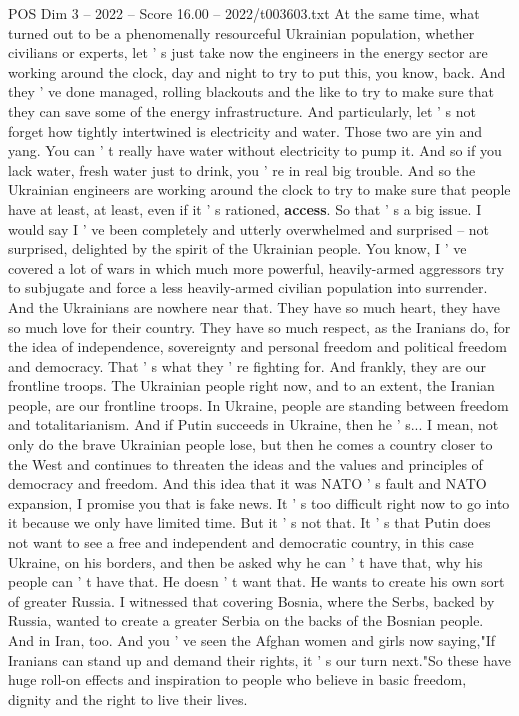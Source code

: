 \begin{textsample}{POS Dim 3 – 2022 – Score 16.00 – 2022/t003603.txt}
At the same time, what turned out to be a phenomenally resourceful Ukrainian population, whether civilians or experts, let ' s just take now the engineers in the energy sector are working around the clock, day and night to try to put this, you know, back.
And they ' ve done managed, rolling blackouts and the like to try to make sure that they can save some of the energy infrastructure.
And particularly, let ' s not forget how tightly intertwined is electricity and water.
Those two are yin and yang.
You can ' t really have water without electricity to pump it.
And so if you lack water, fresh water just to drink, you ' re in real big trouble.
And so the Ukrainian engineers are working around the clock to try to make sure that people have at least, at least, even if it ' s rationed, \textbf{access}.
So that ' s a big issue.
I would say I ' ve been completely and utterly overwhelmed and surprised -- not surprised, delighted by the spirit of the Ukrainian people.
You know, I ' ve covered a lot of wars in which much more powerful, heavily-armed aggressors try to subjugate and force a less heavily-armed civilian population into surrender.
And the Ukrainians are nowhere near that.
They have so much heart, they have so much love for their country.
They have so much respect, as the Iranians do, for the idea of independence, sovereignty and personal freedom and political freedom and democracy.
That ' s what they ' re fighting for.
And frankly, they are our frontline troops.
The Ukrainian people right now, and to an extent, the Iranian people, are our frontline troops.
In Ukraine, people are standing between freedom and totalitarianism.
And if Putin succeeds in Ukraine, then he ' s...
I mean, not only do the brave Ukrainian people lose, but then he comes a country closer to the West and continues to threaten the ideas and the values and principles of democracy and freedom.
And this idea that it was NATO ' s fault and NATO expansion, I promise you that is fake news.
It ' s too difficult right now to go into it because we only have limited time.
But it ' s not that.
It ' s that Putin does not want to see a free and independent and democratic country, in this case Ukraine, on his borders, and then be asked why he can ' t have that, why his people can ' t have that.
He doesn ' t want that.
He wants to create his own sort of greater Russia.
I witnessed that covering Bosnia, where the Serbs, backed by Russia, wanted to create a greater Serbia on the backs of the Bosnian people.
And in Iran, too.
And you ' ve seen the Afghan women and girls now saying,"If Iranians can stand up and demand their rights, it ' s our turn next."So these have huge roll-on effects and inspiration to people who believe in basic freedom, dignity and the right to live their lives.

\end{textsample}
